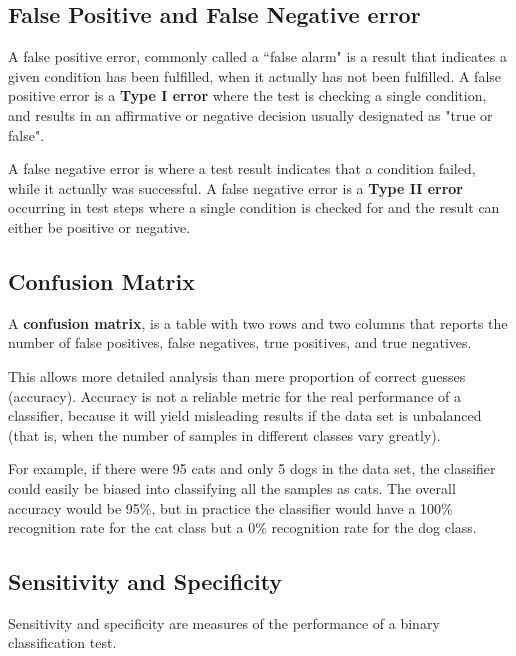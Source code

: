 \documentclass[]{report}
\begin{document}
\subsection{False Positive and False Negative error}

A false positive error, commonly called a ``false alarm" is a result that indicates a
given condition has been fulfilled, when it actually has not been fulfilled.
A false positive error is a \textbf{Type I error} where the test is checking a single condition,
and results in an affirmative or negative decision usually designated as "true or false".

A false negative error is where a test result indicates that a condition failed, while it actually was successful.
A false negative error is a \textbf{Type II error} occurring in test steps where a single
condition is checked for and the result can either be positive or negative.


\subsection{Confusion Matrix}

A \textbf{confusion matrix}, is a table with two rows and two columns that reports the number of false positives, false negatives, true positives, and true negatives.

This allows more detailed analysis than mere proportion of correct guesses (accuracy). Accuracy is not a reliable metric for the real performance of a classifier, because it will yield misleading results if the data set is unbalanced (that is, when the number of samples in different classes vary greatly).

For example, if there were 95 cats and only 5 dogs in the data set, the classifier could easily be biased into classifying all the samples as cats. The overall accuracy would be 95\%, but  in practice the classifier would have a 100\% recognition rate for the cat class but a 0\% recognition rate for the dog class.


\subsection{Sensitivity and Specificity}

Sensitivity and specificity are measures of the performance of a binary classification test.
\end{document}
